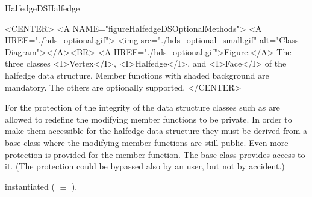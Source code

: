 \begin{ccRefConcept}{HalfedgeDSHalfedge}
\begin{ccHtmlOnly}
    <CENTER>
    <A NAME="figureHalfedgeDSOptionalMethods">
    <A HREF="./hds_optional.gif">
        <img src="./hds_optional_small.gif" 
             alt="Class Diagram"></A><BR>
    <A HREF="./hds_optional.gif">Figure:</A>
    The three classes <I>Vertex</I>, <I>Halfedge</I>, and 
          <I>Face</I> of the halfedge data structure. Member
          functions with shaded background are mandatory. The others
          are optionally supported.
    </CENTER>
\end{ccHtmlOnly}

For the protection of the integrity of the data structure classes such
as  are allowed to redefine the modifying member
functions to be private. In order to make them accessible for the
halfedge data structure they must be derived from a base class
 where the modifying member functions are still public. Even
more protection is provided for the  member
function. The base class  provides access to it.  (The
protection could be bypassed also by an user, but not by accident.)

\ccTypes

\ccThreeToTwo

    {instantiated  ( $\equiv$ ).}
\ccGlue
{}
\ccGlue
{}
\ccGlue
{}
\ccGlue
{}

\ccGlue
{}
\ccGlue
{}
\ccGlue
{}
\ccGlue
{}
\ccGlue
{}

\ccGlue
{}
\ccGlue
{}

\ccCreation
{}


\ccOperations
\ccTagFullDeclarations

\ccGlue
{}
\ccGlue
{}


\end{ccRefConcept}
